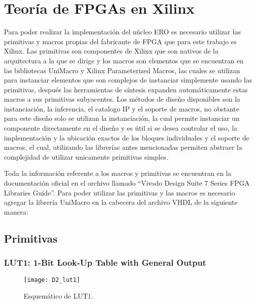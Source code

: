     \section{Teoría de FPGAs en Xilinx}
        Para poder realizar la implementación del núcleo ERO es necesario utilizar las primitivas y macros propias del fabricante de FPGA que para este trabajo es Xilinx. Las primitivas son componentes de Xilinx que son nativos de la arquitectura a la que se dirige y los macros son elementos que se encuentran en las bibliotecas UniMacro y Xilinx Parameterized Macros, las cuales se utilizan para instanciar elementos que son complejos de instanciar simplemente usando las primitivas, después las herramientas de síntesis expanden automáticamente estas macros a sus primitivas subyacentes. Los métodos de diseño disponibles son la instanciación, la inferencia, el catalogo IP y el soporte de macros, no obstante para este diseño solo se utilizan la instanciación, la cual permite instanciar un componente directamente en el diseño y es útil si se desea controlar el uso, la implementación y la ubicación exactos de los bloques individuales y el soporte de macros, el cual, utilizando las librerías antes mencionadas permiten abstraer la complejidad de utilizar unicamente primitivas simples.

        Toda la información referente a los macros y primitivas se encuentran en la documentación oficial en el archivo llamado ``Vivado Design Suite 7 Series FPGA Libraries Guide''. Para poder utilizar las primitivas y las macros es necesario agregar la librería UniMacro en la cabecera del archivo VHDL de la siguiente manera: 

        \vspace{0.4cm}
        

	    \subsection{Primitivas}

		    \subsubsection{LUT1: 1-Bit Look-Up Table with General Output}
	
                \begin{figure}[hbtp]
                    \caption{Esquemático de LUT1.}
                    \centering
                    \texttt{[image: D2\_lut1]}
                    \label{fig:D2_lut1}
                \end{figure}	
	
